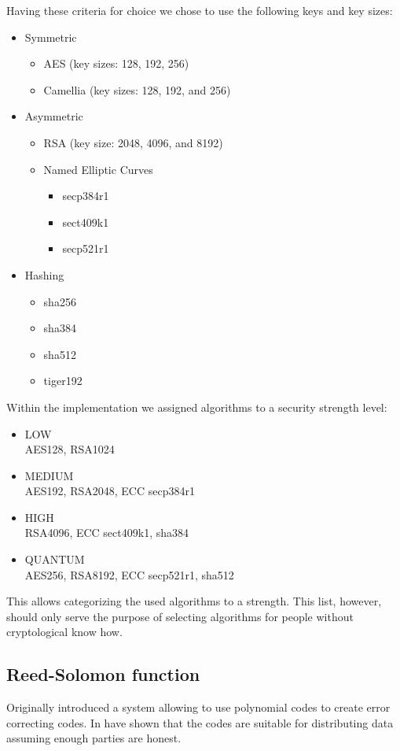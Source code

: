 Having these criteria for choice we chose to use the following keys and key sizes:
\begin{itemize}
	\item Symmetric
	\begin{itemize}
		\item AES (key sizes: 128, 192, 256)
		\item Camellia (key sizes: 128, 192, and 256)
	\end{itemize}
	\item Asymmetric
	\begin{itemize}
		\item RSA (key size: 2048, 4096, and 8192)
		\item Named Elliptic Curves
		\begin{itemize}
			\item secp384r1
			\item sect409k1
			\item secp521r1
		\end{itemize}
	\end{itemize}
	\item Hashing
	\begin{itemize}
		\item sha256
		\item sha384
		\item sha512
		\item tiger192
	\end{itemize}
\end{itemize}

Within the implementation we assigned algorithms to a security strength level:
\begin{itemize}
	\item LOW\\
	      AES128, RSA1024
	\item MEDIUM\\
	      AES192, RSA2048, ECC secp384r1
	\item HIGH\\
		  RSA4096, ECC sect409k1, sha384
	\item QUANTUM\\
	      AES256, RSA8192, ECC secp521r1, sha512
\end{itemize}

This allows categorizing the used algorithms to a strength. This list, however, should only serve the purpose of selecting algorithms for people without cryptological know how.

\subsection{Reed-Solomon function}
Originally \cite{reed1960polynomial} introduced a system allowing to use polynomial codes to create error correcting codes. In \cite{chaum1988multiparty} \citeauthor{chaum1988multiparty} have shown that the codes are suitable for distributing data assuming enough parties are honest.

